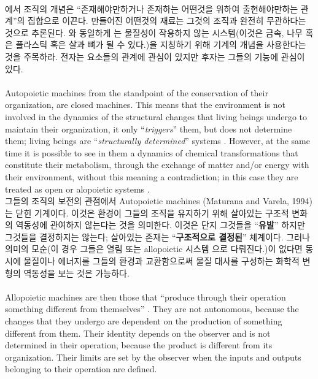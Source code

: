 \documentclass[11pt]{article} %
\begin{document}
\\
\citet{maturana1994maquinas}에서 조직의 개념은 ``존재해야만하거나 존재하는 어떤것을 위하여 출현해야만하는 관계''의 집합으로 이끈다. 만들어진 어떤것의 재료는 그것의 조직과 완전히 무관하다는 것으로 추론된다. \citet{ashby1972introduccion}와 동일하게 \citet{maturana1994maquinas}는 물질성이 작용하지 않는 시스템(이것은 금속, 나무 혹은 플라스틱 혹은 살과 뼈가 될 수 있다.)을 지칭하기 위해 기계의 개념을 사용한다는 것을 주목하라. 전자는 요소들의 관계에 관심이 있지만 후자는 그들의 기능에 관심이 있다.
\\
\\
Autopoietic machines \citep{maturana1994maquinas} from the standpoint of the conservation of their organization, are closed machines. This means that the environment is not involved in the dynamics of the structural changes that living beings undergo to maintain their organization, it only ``\textit{triggers}'' them, but does not determine them; living beings are ``\textit{structurally determined}'' systems \citep{varela2003arbol}. However, at the same time it is possible to see in them a dynamics of chemical transformations that constitute their metabolism, through the exchange of matter and/or energy with their environment, without this meaning a contradiction; in this case they are treated as open \citep{von1993teoria} or alopoietic systems \citep{maturana1994maquinas}.
\\
그들의 조직의 보전의 관점에서 Autopoietic machines (Maturana and Varela, 1994)는 닫힌  기계이다. 이것은 환경이 그들의 조직을 유지하기 위해 살아있는 구조적 변화의 역동성에 관여하지 않는다는 것을 의미한다. 이것은 단지 그것들을 ``\textbf{유발}'' 하지만 그것들을 결정하지는 않는다; 살아있는 존재는 ``\textbf{구조적으로 결정된}'' 체계이다\citep{varela2003arbol}. 그러나 의미의 모순(이 경우 그들은 열림 \citep{von1993teoria} 또는 allopoietic 시스템 \citep{maturana1994maquinas}으로 다뤄진다.)이 없다면 동시에 물질이나 에너지를 그들의 환경과 교환함으로써 물질 대사를 구성하는 화학적 변형의 역동성을 보는 것은 가능하다.
\\
\\
Allopoietic machines are then those that ``produce through their operation something different from themselves'' \citep[p.71]{maturana1994maquinas}. They are not autonomous, because the changes that they undergo are dependent on the production of something different from them. Their identity depends on the observer and is not determined in their operation, because the product is different from its organization. Their limits are set by the observer when the inputs and outputs belonging to their operation are defined\citep{maturana1994maquinas}.
\end{document}
